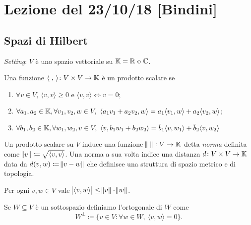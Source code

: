 \section{Lezione del 23/10/18 [Bindini]}

\subsection{Spazi di Hilbert}
\emph{Setting}: $ V $ è uno spazio vettoriale su $ \mathbb{K} = \mathbb{R} \text{ o } \mathbb{C} $. 

\begin{definition}
    Una funzione $ {\langle \; , \, \rangle} \colon V \times V \to \mathbb{K} $ è un prodotto scalare se 
    \begin{enumerate}[label = (\roman*)]
        \item $ \forall v \in V, \ {\langle v, v \rangle} \geq 0 $ e $ {\langle v, v \rangle} \iff v = 0 $;
        \item $ \forall a_1, a_2 \in \mathbb{K}, \forall v_1, v_2, w \in V, \ {\langle a_1v_1 + a_2v_2, w \rangle} = a_1{\langle v_1, w\rangle} + a_2{\langle v_2, w\rangle} $;
        \item $ \forall b_1, b_2 \in \mathbb{K}, \forall w_1, w_2, v \in V, \ {\langle v, b_1w_1 + b_2w_2 \rangle} = \bar{b}_1{\langle v, w_1\rangle} + \bar{b}_2{\langle v, w_2\rangle} $
    \end{enumerate}
\end{definition}

Un prodotto scalare su $ V $ induce una funzione $ \norm{\;} \colon V \to \mathbb{K}  $ detta \emph{norma} definita come $ {\norm{v} \coloneqq \sqrt{{\langle v, v \rangle}}} $. Una norma a sua volta indice una distanza $ d \colon V \times V \to \mathbb{K} $ data da \linebreak $ d(v, w) \coloneqq \norm{v - w} $ che definisce una struttura di spazio metrico e di topologia.

\begin{proposition}
    Per ogni $ v, w \in V $ vale $ \abs{{\langle v, w \rangle}} \leq \norm{v} \cdot \norm{w} $. 
\end{proposition}

\begin{definition}
    Se $ W \subseteq V $ è un sottospazio definiamo l'ortogonale di $ W $ come 
    \[
        W^{\perp} \coloneqq \{v \in V : \forall w \in W, \ {\langle v, w \rangle} = 0\}.
    \]
\end{definition}

